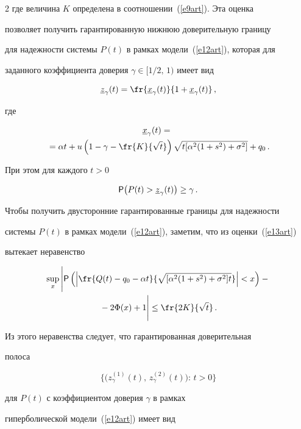\begin{multicols}{2}
где величина $K$ определена в соотношении~(\ref{e9art}). Эта оценка


позволяет получить гарантированную нижнюю доверительную границу


для надежности системы $P(t)$ в рамках модели~(\ref{e12art}), которая для


заданного коэффициента доверия $\gamma\in [1/2,\,1)$ имеет вид


$$


\underline z_{\gamma}(t)=\fr{\underline


x_{\gamma}(t)}{1+\underline x_{\gamma}(t)}\,,


$$


где


\begin{multline*}


\!\underline x_{\gamma}(t)={}\\


{}=\alpha


t+u\left(1-\gamma-\fr{K}{\sqrt{t}}\right)\sqrt{t[\alpha^2(1+s^2)+\sigma^2]}+


q_0\,.


\end{multline*}


При этом для каждого $t>0$


$$


{\sf P}\big(P(t)>\underline z_{\gamma}(t)\big)\ge\gamma\,.


$$





Чтобы получить двусторонние гарантированные границы для надежности


системы $P(t)$ в рамках модели~(\ref{e12art}), заметим, что из оценки~(\ref{e13art})


вытекает неравенство


\begin{multline*}


\sup_x\Bigg|{\sf P}\left(\left|\fr{Q(t)-q_0-\alpha


t}{\sqrt{[\alpha^2(1+s^2)+\sigma^2]t}}\right|<x\right)-{}\\


{}-2\Phi(x)+1\Bigg|\le


\fr{2K}{\sqrt{t}}\,.


\end{multline*}


Из этого неравенства следует, что гарантированная доверительная


полоса


$$


\big\{\big(z^{(1)}_{\gamma}(t),\,z^{(2)}_{\gamma}(t)\big):\,t>0\big\}


$$


для $P(t)$ с коэффициентом доверия $\gamma$ в рамках


гиперболической модели~(\ref{e12art}) имеет вид


\end{multicols}



